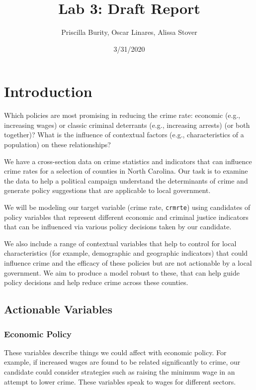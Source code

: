 \documentclass[]{article}
\title{Lab 3: Draft Report}
\author{Priscilla Burity, Oscar Linares, Alissa Stover}
\date{3/31/2020}
\begin{document}
\maketitle

\hypertarget{introduction}{%
\section{Introduction}\label{introduction}}

Which policies are most promising in reducing the crime rate: economic
(e.g., increasing wages) or classic criminal deterrants (e.g.,
increasing arrests) (or both together)? What is the influence of
contextual factors (e.g., characteristics of a population) on these
relationships?

We have a cross-section data on crime statistics and indicators that can
influence crime rates for a selection of counties in North Carolina. Our
task is to examine the data to help a political campaign understand the
determinants of crime and generate policy suggestions that are
applicable to local government.

We will be modeling our target variable (crime rate, \texttt{crmrte})
using candidates of policy variables that represent different economic
and criminal justice indicators that can be influenced via various
policy decisions taken by our candidate.

We also include a range of contextual variables that help to control for
local characteristics (for example, demographic and geographic
indicators) that could influence crime and the efficacy of these
policies but are not actionable by a local government. We aim to produce
a model robust to these, that can help guide policy decisions and help
reduce crime across these counties.

\hypertarget{actionable-variables}{%
\subsection{Actionable Variables}\label{actionable-variables}}

\hypertarget{economic-policy}{%
\subsubsection{Economic Policy}\label{economic-policy}}

These variables describe things we could affect with economic policy.
For example, if increased wages are found to be related significantly to
crime, our candidate could consider strategies such as raising the
minimum wage in an attempt to lower crime. These variables speak to
wages for different sectors.
\end{document}

